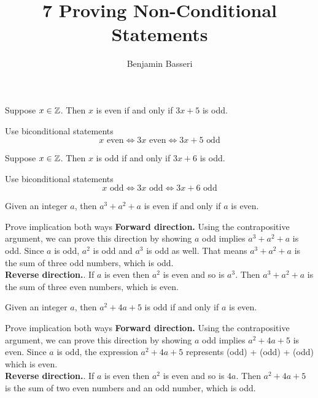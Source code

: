 \documentclass{article}
\title{7 Proving Non-Conditional Statements}
\author{Benjamin Basseri}
\begin{document}
\maketitle

\begin{problem}
Suppose $x \in \mathbb{Z}$. Then $x$ is even if and only if $3x + 5$ is odd.
\end{problem}

\begin{solution}{Use biconditional statements}
  $$x \text{ even} \iff 3x \text{ even} \iff 3x + 5 \text{ odd}$$
\end{solution}

\begin{problem}
Suppose $x \in \mathbb{Z}$. Then $x$ is odd if and only if $3x + 6$ is odd.
\end{problem}
\begin{solution}{Use biconditional statements}
  $$x \text{ odd} \iff 3x \text{ odd} \iff 3x + 6 \text{ odd}$$
\end{solution}

\begin{problem}
Given an integer $a$, then $a^3 + a^2 + a$ is even if and only if $a$ is even.
\end{problem}
\begin{solution}{Prove implication both ways}
  \textbf{Forward direction.} Using the contrapositive argument, we can prove this direction by showing $a$ odd implies $a^3 + a^2 + a$ is odd. Since $a$ is odd, $a^2$ is odd and $a^3$ is odd as well. That means $a^3 + a^2 + a$ is the sum of three odd numbers, which is odd.
  \\
  \textbf{Reverse direction.}. If $a$ is even then $a^2$ is even and so is $a^3$. Then $a^3 + a^2 + a$ is the sum of three even numbers, which is even.
\end{solution}

\begin{problem}
Given an integer $a$, then $a^2 + 4a + 5$ is odd if and only if $a$ is even.
\end{problem}
\begin{solution}{Prove implication both ways}
  \textbf{Forward direction.} Using the contrapositive argument, we can prove this direction by showing $a$ odd implies $a^2 + 4a + 5$ is even. Since $a$ is odd, the expression $a^2 + 4a + 5$ represents (odd) + (odd) + (odd) which is even.
  \\
  \textbf{Reverse direction.}. If $a$ is even then $a^2$ is even and so is $4a$. Then $a^2 + 4a + 5$ is the sum of two even numbers and an odd number, which is odd.
\end{solution}
\end{document}
